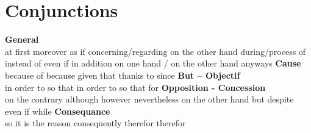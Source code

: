 \section{Conjunctions}
  {\sffamily\bfseries General}\\
     {at first}
    {moreover}
    {as if}
     {concerning/regarding}
     {on the other hand}
     {during/process of}
     {instead of}
     {even if}
     {in addition}
     {on one hand / on the other hand}
     {anyways}
{\sffamily\bfseries Cause}\\
   {because of}
   {because}
   {given that}
   {thanks to}
   {since}
{\sffamily\bfseries But -- Objectif}\\
   {in order to}
   {so that}
   {in order to}
   {so that}
   {for}
{\sffamily\bfseries Opposition - Concession}\\
   {on the contrary}
   {although}
   {however}
   {nevertheless}
   {on the other hand}
   {but}
   {despite}
   {even if}
   {while}
{\sffamily\bfseries Consequance}\\
   {so}
   {it is the reason}
   {}
   {consequently}
   {therefor}
   {therefor}

